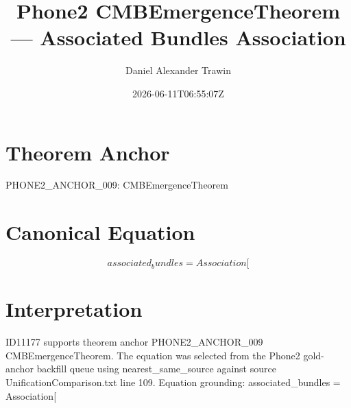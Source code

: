 \documentclass[11pt]{article}
\title{Phone2 CMBEmergenceTheorem — Associated Bundles Association}
\author{Daniel Alexander Trawin}
\date{2026-06-11T06:55:07Z}
\begin{document}
\maketitle
\section*{Theorem Anchor}
PHONE2_ANCHOR_009: CMBEmergenceTheorem
\section*{Canonical Equation}
\[
associated_bundles = Association[
\]
\section*{Interpretation}
ID11177 supports theorem anchor PHONE2_ANCHOR_009 CMBEmergenceTheorem. The equation was selected from the Phone2 gold-anchor backfill queue using nearest_same_source against source UnificationComparison.txt line 109. Equation grounding: associated_bundles = Association[
\end{document}
